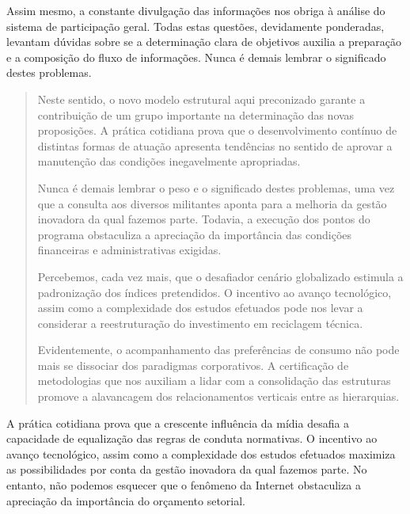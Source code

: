 \documentclass[fleqn]{icat-ufal}
\begin{document}
Assim mesmo, a constante divulgação das informações nos obriga à análise do
sistema de participação geral. Todas estas questões, devidamente ponderadas,
levantam dúvidas sobre se a determinação clara de objetivos auxilia a preparação
e a composição do fluxo de informações. Nunca é demais lembrar o significado destes
problemas.

\begin{quotation}
    Neste sentido, o novo modelo estrutural aqui preconizado garante a contribuição
    de um grupo importante na determinação das novas proposições. A prática
    cotidiana prova que o desenvolvimento contínuo de distintas formas de atuação
    apresenta tendências no sentido de aprovar a manutenção das condições
    inegavelmente apropriadas. 
    
    Nunca é demais lembrar o peso e o significado destes
    problemas, uma vez que a consulta aos diversos militantes aponta para a melhoria
    da gestão inovadora da qual fazemos parte. Todavia, a execução dos pontos do
    programa obstaculiza a apreciação da importância das condições financeiras e
    administrativas exigidas. 
    
    Percebemos, cada vez mais, que o desafiador cenário globalizado estimula a
    padronização dos índices pretendidos. O incentivo ao avanço tecnológico, assim
    como a complexidade dos estudos efetuados pode nos levar a considerar a
    reestruturação do investimento em reciclagem técnica. 
    
    Evidentemente, o acompanhamento das preferências de consumo não pode mais se 
    dissociar dos paradigmas corporativos. A certificação de metodologias que nos 
    auxiliam a lidar com a consolidação das estruturas promove a alavancagem dos 
    relacionamentos verticais entre as hierarquias. 
\end{quotation}

A prática cotidiana prova que a crescente influência da mídia desafia a
capacidade de equalização das regras de conduta normativas. 
O incentivo ao avanço tecnológico, assim como a complexidade dos estudos
efetuados maximiza as possibilidades por conta da gestão inovadora da qual
fazemos parte.
No entanto, não podemos esquecer que o fenômeno da Internet obstaculiza a
apreciação da importância do orçamento setorial. 
\end{document}
